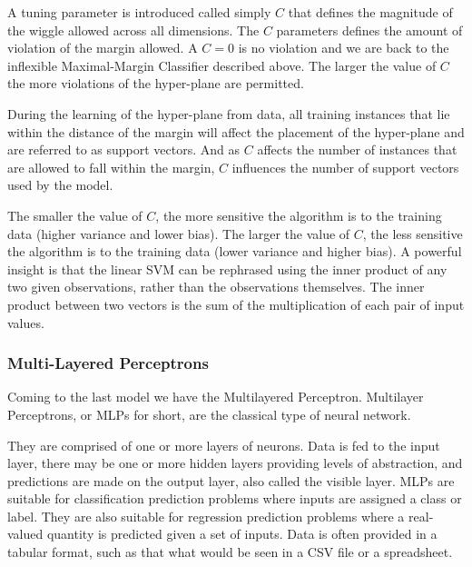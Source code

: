 \documentclass[12pt]{article}
\begin{document}
A tuning parameter is introduced called simply $C$ that defines the magnitude of the wiggle allowed across all dimensions. The $C$ parameters defines the amount of violation of the margin allowed. A $C=0$ is no violation and we are back to the inflexible Maximal-Margin Classifier described above. The larger the value of $C$ the more violations of the hyper-plane are permitted.

During the learning of the hyper-plane from data, all training instances that lie within the distance of the margin will affect the placement of the hyper-plane and are referred to as support vectors. And as $C$ affects the number of instances that are allowed to fall within the margin, $C$ influences the number of support vectors used by the model.

The smaller the value of $C$, the more sensitive the algorithm is to the training data (higher variance and lower bias). The larger the value of $C$, the less sensitive the algorithm is to the training data (lower variance and higher bias). A powerful insight is that the linear SVM can be rephrased using the inner product of any two given observations, rather than the observations themselves. The inner product between two vectors is the sum of the multiplication of each pair of input values.


\subsubsection{Multi-Layered Perceptrons}

Coming to the last model we have the Multilayered Perceptron. Multilayer Perceptrons, or MLPs for short, are the classical type of neural network.

They are comprised of one or more layers of neurons. Data is fed to the input layer, there may be one or more hidden layers providing levels of abstraction, and predictions are made on the output layer, also called the visible layer. MLPs are suitable for classification prediction problems where inputs are assigned a class or label. They are also suitable for regression prediction problems where a real-valued quantity is predicted given a set of inputs. Data is often provided in a tabular format, such as that what would be seen in a CSV file or a spreadsheet.
\end{document}
